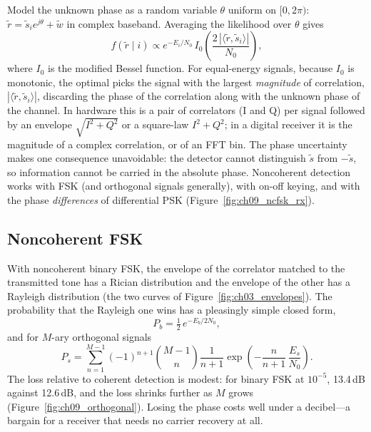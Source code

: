 Model the unknown phase as a random variable $\theta$ uniform on $[0,2\pi)$:
$\tilde r=\tilde s_ie^{j\theta}+\tilde w$ in complex baseband. Averaging the likelihood over
$\theta$ gives
\begin{equation}
f(\tilde r\mid i)\propto e^{-E_i/N_0}\,I_0\!\left(\frac{2\,|\langle\tilde r,\tilde s_i\rangle|}{N_0}\right),
\end{equation}
where $I_0$ is the modified Bessel function. For equal-energy signals, because $I_0$ is monotonic,
the optimal  picks the signal with the largest \emph{magnitude} of
correlation, $|\langle\tilde r,\tilde s_i\rangle|$, discarding the phase of the correlation along
with the unknown phase of the channel. In hardware this is a pair of correlators (I and Q) per
signal followed by an envelope $\sqrt{I^2+Q^2}$ or a square-law $I^2+Q^2$; in a digital receiver
it is the magnitude of a complex correlation, or of an FFT bin. The phase uncertainty makes one
consequence unavoidable: the detector cannot distinguish $\tilde s$ from $-\tilde s$, so
information cannot be carried in the absolute phase. Noncoherent detection works with FSK (and
orthogonal signals generally), with on-off keying, and with the phase \emph{differences} of
differential PSK (Figure~\ref{fig:ch09_ncfsk_rx}).

\subsection{Noncoherent FSK}

With noncoherent binary FSK, the envelope of the correlator matched to the transmitted tone has
a Rician distribution and the envelope of the other has a Rayleigh distribution (the two curves
of Figure~\ref{fig:ch03_envelopes}). The probability that the Rayleigh one wins has a pleasingly
simple closed form,
\begin{equation}
P_b=\tfrac12\,e^{-E_b/2N_0},
\label{eq:ch09:ncfsk}
\end{equation}
and for $M$-ary orthogonal signals
\begin{equation}
P_s=\sum_{n=1}^{M-1}(-1)^{n+1}\binom{M-1}{n}\frac{1}{n+1}\exp\!\left(-\frac{n}{n+1}\,\frac{E_s}{N_0}\right).
\end{equation}
The loss relative to coherent detection is modest: for binary FSK at $10^{-5}$, 13.4\,dB against
12.6\,dB, and the loss shrinks further as $M$ grows (Figure~\ref{fig:ch09_orthogonal}). Losing the
phase costs well under a decibel---a bargain for a receiver that needs no carrier recovery at all.

